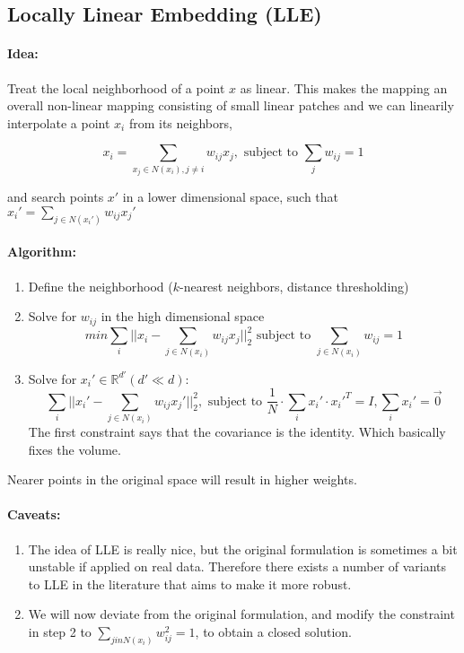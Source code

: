 

\subsection*{Locally Linear Embedding (LLE)}

\paragraph{Idea:} Treat the local neighborhood of a point \(x\) as linear. This makes the mapping an overall non-linear mapping consisting of small linear patches and we can linearily interpolate a point \(x_i\) from its neighbors,

\[x_i = \sum_{x_j \in N(x_i), j \neq i} w_{ij} x_j, \text{ subject to } \sum_j w_{ij} = 1\]

and search points \(x'\) in a lower dimensional space, such that $x_i' = \sum_{j \in N(x_i')} w_{ij} x_j'$

\paragraph{Algorithm:}
\begin{enumerate}
    \item
        Define the neighborhood (\(k\)-nearest neighbors, distance thresholding)
    \item
        Solve for \(w_{ij}\) in the high dimensional space
        \[min \sum_{i}||x_i - \sum_{j\in N(x_i)} w_{ij} x_j||_2^2 \text{ subject to } \sum_{j \in N(x_i)} w_{ij} = 1\]%
    \item
        Solve for \(x_i' \in \mathbb{R}^{d'} (d' \ll d)\):
        \[\sum_i ||x_i' - \sum_{j \in N(x_i)} w_{ij} x_j'||_2^2, \text{ subject to } \frac{1}{N} \cdot \sum_i x_i' \cdot x_i'^T = I, \sum_i x_i' = \vec{0}\]
        The first constraint says that the covariance is the identity. Which basically fixes the volume.
\end{enumerate}
Nearer points in the original space will result in higher weights.

\paragraph{Caveats:}
\begin{enumerate}
    \item
        The idea of LLE is really nice, but the original formulation is sometimes a bit unstable if applied on real data. Therefore there exists a number of variants to LLE in the literature that aims to make it more robust.
    \item
        We will now deviate from the original formulation, and modify the constraint in step 2 to \(\sum_{j in N(x_i)} w_{ij}^2 =1\), to obtain a closed solution.
\end{enumerate}

